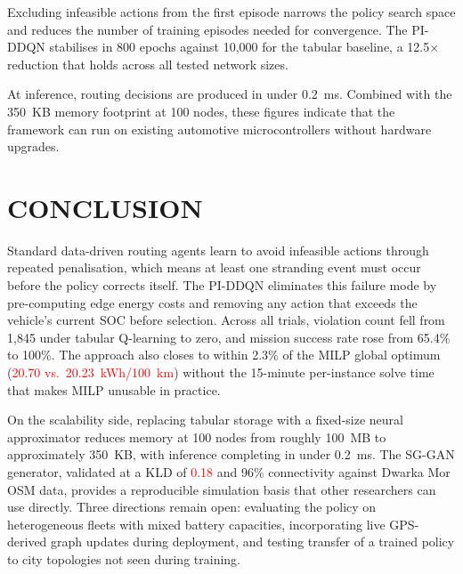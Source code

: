 \documentclass[conference]{IEEEtran}
\begin{document}
Excluding infeasible actions from the first episode narrows the policy search space and reduces the number of training episodes needed for convergence. The PI-DDQN stabilises in 800 epochs against 10,000 for the tabular baseline, a 12.5$\times$ reduction that holds across all tested network sizes.

At inference, routing decisions are produced in under 0.2~ms. Combined with the 350~KB memory footprint at 100 nodes, these figures indicate that the framework can run on existing automotive microcontrollers without hardware upgrades.

\section{CONCLUSION}
\label{VI}
Standard data-driven routing agents learn to avoid infeasible actions through repeated penalisation, which means at least one stranding event must occur before the policy corrects itself. The PI-DDQN eliminates this failure mode by pre-computing edge energy costs and removing any action that exceeds the vehicle's current SOC before selection. Across all trials, violation count fell from 1,845 under tabular Q-learning to zero, and mission success rate rose from 65.4\% to 100\%. The approach also closes to within 2.3\% of the MILP global optimum (\textcolor{red}{20.70 vs.\ 20.23~kWh/100~km}) without the 15-minute per-instance solve time that makes MILP unusable in practice.

On the scalability side, replacing tabular storage with a fixed-size neural approximator reduces memory at 100 nodes from roughly 100~MB to approximately 350~KB, with inference completing in under 0.2~ms. The SG-GAN generator, validated at a KLD of \textcolor{red}{0.18} and 96\% connectivity against Dwarka Mor OSM data, provides a reproducible simulation basis that other researchers can use directly. Three directions remain open: evaluating the policy on heterogeneous fleets with mixed battery capacities, incorporating live GPS-derived graph updates during deployment, and testing transfer of a trained policy to city topologies not seen during training.
\end{document}
